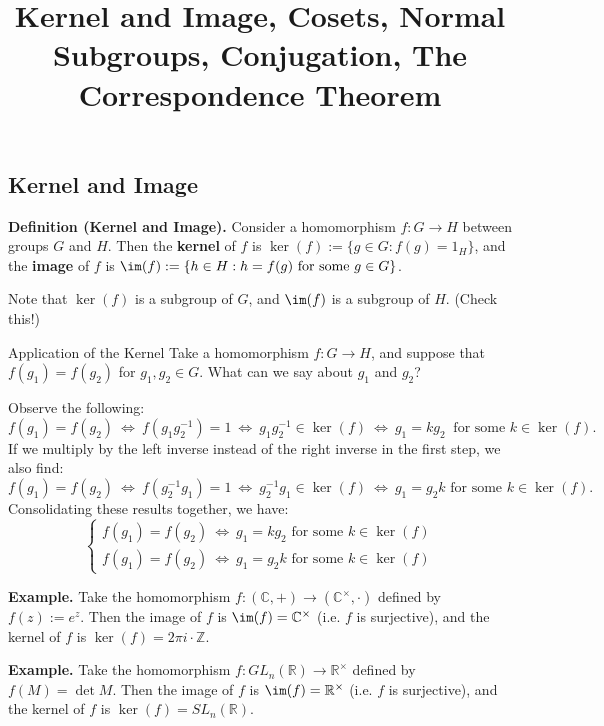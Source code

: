 \title{Kernel and Image, Cosets, Normal Subgroups, Conjugation, The Correspondence Theorem}



\subsection{Kernel and Image}

\textbf{Definition (Kernel and Image).} Consider a homomorphism $f: G \to H$ between groups $G$ and $H$.  Then the \textbf{kernel} of $f$ is $\ker(f) := \{g \in G : f(g) = 1_H\}$, and the \textbf{image} of $f$ is $\im (f) := \{h \in H: h = f(g) \text{ for some } g \in G\}$.

Note that $\ker(f)$ is a subgroup of $G$, and $\im(f)$ is a subgroup of $H$.  (Check this!)

\begin{problem}{Application of the Kernel}
    Take a homomorphism $f: G \to H$, and suppose that $f(g_1) = f(g_2)$ for $g_1, g_2 \in G$.  What can we say about $g_1$ and $g_2$?
\end{problem}

\begin{solution*}
    Observe the following:
    \[ f(g_1) = f(g_2) ~ \iff ~ f(g_1g_2^{-1}) = 1 ~ \iff ~ g_1g_2^{-1} \in \ker(f) ~ \iff ~ g_1 = kg_2 ~ \text{ for some } k \in \ker(f). \]
    If we multiply by the left inverse instead of the right inverse in the first step, we also find:
    \[ f(g_1) = f(g_2) ~ \iff ~ f(g_2^{-1}g_1) = 1 ~ \iff ~ g_2^{-1}g_1 \in \ker(f) ~ \iff ~ g_1 = g_2k \text{ for some } k \in \ker(f). \]
    Consolidating these results together, we have:
    \[ \boxed{\begin{cases}f(g_1) = f(g_2) ~ \iff ~ g_1 = kg_2 \text{ for some } k \in \ker(f) \\
    f(g_1) = f(g_2) ~ \iff ~ g_1 = g_2k \text{ for some } k \in \ker(f)\end{cases}} \]
\end{solution*}

\textbf{Example.} Take the homomorphism $f: (\mathbb{C}, +) \to (\mathbb{C}^{\times}, \cdot)$ defined by $f(z) := e^z$.  Then the image of $f$ is $\im(f) = \mathbb{C}^{\times}$ (i.e. $f$ is surjective), and the kernel of $f$ is $\ker(f) = 2\pi i \cdot \mathbb{Z}$.

\textbf{Example.} Take the homomorphism $f: GL_n(\mathbb{R}) \to \mathbb{R}^{\times}$ defined by $f(M) = \det M$.  Then the image of $f$ is $\im(f) = \mathbb{R}^{\times}$ (i.e. $f$ is surjective), and the kernel of $f$ is $\ker(f) = SL_n(\mathbb{R})$.

